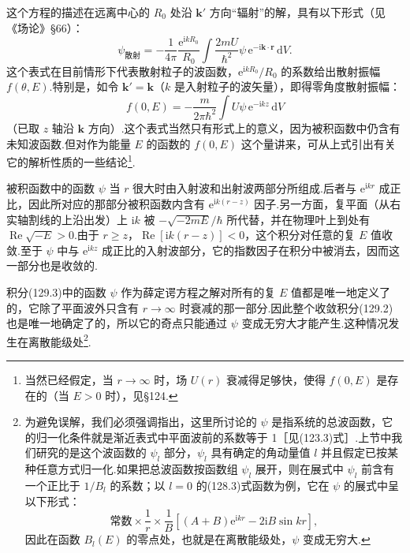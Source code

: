 这个方程的描述在远离中心的 $R_0$ 处沿 $\boldsymbol{k}'$ 方向“辐射”的解，具有以下形式（见《场论》§66）：
\begin{equation}
  \psi_{\text{散射}}=-\frac{1}{4\pi}\frac{\mathrm{e}^{\mathrm{i}kR_0}}{R_0}
  \int\frac{2mU}{\hbar^2}\psi\,
  \mathrm{e}^{-\mathrm{i}\boldsymbol{k}\cdot\boldsymbol{r}}\,\mathrm{d}V.
\end{equation}
这个表式在目前情形下代表散射粒子的波函数，$\mathrm{e}^{\mathrm{i}kR_0}/R_0$ 的系数给出散射振幅 $f(\theta,E)$.特别是，如令 $\boldsymbol{k}'=\boldsymbol{k}$（$k$ 是入射粒子的波矢量），即得零角度散射振幅：
\begin{equation}
  f(0,E)=-\frac{m}{2\pi\hbar^2}
  \int U\psi\,\mathrm{e}^{-\mathrm{i}kz}\,\mathrm{d}V
\end{equation}
（已取 $z$ 轴沿 $\boldsymbol{k}$ 方向）.这个表式当然只有形式上的意义，因为被积函数中仍含有未知波函数.但对作为能量 $E$ 的函数的 $f(0,E)$ 这个量讲来，可从上式引出有关它的解析性质的一些结论\footnote{当然已经假定，当 $r\to\infty$ 时，场 $U(r)$ 衰减得足够快，使得 $f(0,E)$ 是存在的（当 $E>0$ 时），见§124.}.

被积函数中的函数 $\psi$ 当 $r$ 很大时由入射波和出射波两部分所组成.后者与 $\mathrm{e}^{\mathrm{i}kr}$ 成正比，因此所对应的那部分被积函数内含有 $\mathrm{e}^{\mathrm{i}k(r-z)}$ 因子.另一方面，复平面（从右实轴割线的上沿出发）上 $\mathrm{i}k$ 被 $-\sqrt{-2mE}/\hbar$ 所代替，并在物理叶上到处有 $\operatorname{Re}\sqrt{-E}>0$.由于 $r\geqslant z$，$\operatorname{Re}[\mathrm{i}k(r-z)]<0$，这个积分对任意的复 $E$ 值收敛.至于 $\psi$ 中与 $\mathrm{e}^{\mathrm{i}kz}$ 成正比的入射波部分，它的指数因子在积分中被消去，因而这一部分也是收敛的.

积分(129.3)中的函数 $\psi$ 作为薛定谔方程之解对所有的复 $E$ 值都是唯一地定义了的，它除了平面波外只含有 $r\to\infty$ 时衰减的那一部分.因此整个收敛积分(129.2)也是唯一地确定了的，所以它的奇点只能通过 $\psi$ 变成无穷大才能产生.这种情况发生在离散能级处\footnote{为避免误解，我们必须强调指出，这里所讨论的 $\psi$ 是指系统的总波函数，它的归一化条件就是渐近表式中平面波前的系数等于 1［见(123.3)式］.上节中我们研究的是这个波函数的 $\psi_l$ 部分，$\psi_l$ 具有确定的角动量值 $l$ 并且假定已按某种任意方式归一化.如果把总波函数按函数组 $\psi_l$ 展开，则在展式中 $\psi_l$ 前含有一个正比于 $1/B_l$ 的系数；以 $l=0$ 的(128.3)式函数为例，它在 $\psi$ 的展式中呈以下形式：
\begin{equation*}
  \text{常数}\times\frac{1}{r}\times\frac{1}{B}\left[(A+B)\mathrm{e}^{\mathrm{i}kr}-2\mathrm{i}B\sin kr\right],
\end{equation*}
因此在函数 $B_l(E)$ 的零点处，也就是在离散能级处，$\psi$ 变成无穷大.}.

